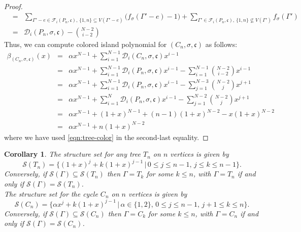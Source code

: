 \documentclass[10pt, reqno]{amsart}
\newcommand{\hf}{\hspace*{0.5cm}}
\theoremstyle{plain}
\newtheorem{cor}[theorem]{Corollary}
\theoremstyle{remark}
\theoremstyle{definition}
\numberwithin{equation}{section}
\begin{document}
\begin{proof}
\begin{eqnarray*}
    & = & \sum_{\Gamma'-e\in\mathscr{F}_i(P_n,\mathfrak{c}),\,\{1,n\}\subseteq V(\Gamma'-e)}\big(f_\sigma(\Gamma'-e)-1\big)+\sum_{\Gamma'\in\mathscr{F}_i(P_n,\mathfrak{c}),\,\{1,n\}\not\subseteq V(\Gamma')}f_\sigma(\Gamma')\\
    & = & \mathscr{D}_i(P_n,\sigma,\mathfrak{c})-{N-2 \choose i-2}
\end{eqnarray*}
Thus, we can compute colored island polynomial for $(C_n,\sigma,\mathfrak{c})$ as follows:
\begin{eqnarray*}
\beta_{(C_n,\sigma,\mathfrak{c})}(x) & = & \alpha x^{N-1}+\sum_{i=1}^{N-1} \mathscr{D}_i(C_n,\sigma,\mathfrak{c})x^{i-1}\\
& = & \alpha x^{N-1}+\sum_{i=1}^{N-1} \mathscr{D}_i(P_n,\sigma,\mathfrak{c})x^{i-1}-\sum_{i=1}^{N-1}{N-2 \choose i-2}x^{i-1}\\
& = & \alpha x^{N-1}+\sum_{i=1}^{N-1} \mathscr{D}_i(P_n,\sigma,\mathfrak{c})x^{i-1}-\sum_{j=1}^{N-3}{N-2 \choose j}x^{j+1}\\
& = & \alpha x^{N-1}+\sum_{i=1}^{N} \mathscr{D}_i(P_n,\sigma,\mathfrak{c})x^{i-1}-\sum_{j=1}^{N-2}{N-2 \choose j}x^{j+1}\\
& = & \alpha x^{N-1}+(1+x)^{N-1}+(n-1)(1+x)^{N-2}-x(1+x)^{N-2}\\
& = & \alpha x^{N-1}+n(1+x)^{N-2}
\end{eqnarray*}
where we have used \eqref{eqn:tree-color} in the second-last equality. 
\end{proof}
\begin{cor}
The structure set for any tree $T_n$ on $n$ vertices is given by
\begin{equation}\label{eqn:str-tree}
\mathscr{S}(T_n)=\{(1+x)^j+k(1+x)^{j-1}\,|\,0\leq j \leq n-1,\,j\leq k\leq n-1\}.
\end{equation}
Conversely, if $\mathscr{S}(\Gamma)\subseteq \mathscr{S}(T_n)$ then $\Gamma=T_k$ for some $k\leq n$, with $\Gamma=T_n$ if and only if $\mathscr{S}(\Gamma)= \mathscr{S}(T_n)$.\\
\hf The structure set for the cycle $C_n$ on $n$ vertices is given by
\begin{equation}\label{eqn:str-cycle}
\mathscr{S}(C_n)=\{\alpha x^j+k(1+x)^{j-1}\,|\,\alpha\in\{1,2\},\,0\leq j \leq n-1,\,j+1\leq k\leq n\}.
\end{equation}
Conversely, if $\mathscr{S}(\Gamma)\subseteq \mathscr{S}(C_n)$ then $\Gamma=C_k$ for some $k\leq n$, with $\Gamma=C_n$ if and only if $\mathscr{S}(\Gamma)= \mathscr{S}(C_n)$.
\end{cor}
\end{document}
